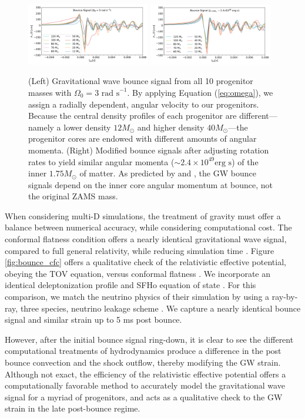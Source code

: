 \documentclass[twocolumn,times]{aastex62}  %
\begin{document}
\begin{figure}[t]
  \centering     %
  \includegraphics[width=0.48\textwidth]{figures/hd3_bounce_test.pdf}
  \includegraphics[width=0.48\textwidth]{figures/hdj_bounce_final.pdf}
  \caption{(Left) Gravitational wave bounce signal from all 10 progenitor masses with $\Omega_0 = 3 \text{ rad s}^{-1}$.  By applying Equation (\ref{eq:omega}), we assign a radially dependent, angular velocity to our progenitors.  Because the central density profiles of each progenitor are different---namely a lower density $12 M_\odot$ and higher density $40 M_\odot$---the progenitor cores are endowed with different amounts of angular momenta.   (Right) Modified bounce signals after adjusting rotation rates to yield similar angular momenta ($\sim 2.4\times10^{49} \text{erg s}$) of the inner $1.75 M_\odot$ of matter.  As predicted by \citet{dimm:2008} and \citet{abdik:2010,abdik:2014}, the GW bounce signals depend on the inner core angular momentum at bounce, not the original ZAMS mass.}
  \label{fig:bounce}
\end{figure}

When considering multi-D simulations, the treatment of gravity must offer a balance between numerical accuracy, while considering computational cost.   The conformal flatness condition offers a nearly identical gravitational wave signal, compared to full general relativity, while reducing simulation time \citep{ott:2007}.  Figure \ref{fig:bounce_cfc} offers a qualitative check of the relativistic effective potential, obeying the TOV equation, versus conformal flatness \citep{marek:2006,richers:2017}.  We incorporate an identical deleptonization profile and SFHo equation of state \citep{steiner:2013}.  For this comparison, we match the neutrino physics of their simulation by using a ray-by-ray, three species, neutrino leakage scheme \cite{oconnor:2010,couch:2014}.  We capture a nearly identical bounce signal and similar strain up to 5 ms post bounce. \par
However, after the initial bounce signal ring-down, it is clear to see the different computational treatments of hydrodynamics produce a difference in the post bounce convection and the shock outflow, thereby modifying the GW strain.  Although not exact, the efficiency of the relativistic effective potential offers a computationally favorable method to accurately model the gravitational wave signal for a myriad of progenitors, and acts as a qualitative check to the GW strain in the late post-bounce regime.\\
\end{document}

